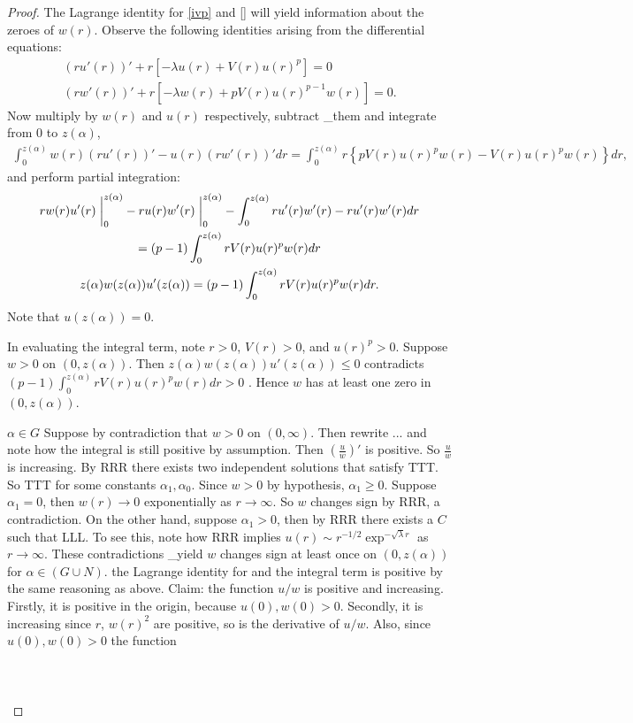 \begin{lemma}
\begin{proof}
  \seperate

The Lagrange identity for \ref{ivp} and \ref{} will yield information about the zeroes of $w(r)$.
Observe the following identities arising from the differential equations:
\begin{gather*}
  (ru'(r))'+r\left[-\lambda u(r)+V(r)u(r)^p\right]=0\\
  (rw'(r))'+r\left[-\lambda w(r)+pV(r)u(r)^{p-1}w(r)\right]=0.
\end{gather*}
Now multiply by $w(r)$ and $u(r)$ respectively, subtract \_them and integrate from 0 to $z(\alpha)$,
\begin{gather*}
  \int_0^{z(\alpha)}w(r)(ru'(r))'-u(r)(rw'(r))'dr=%
  \int_0^{z(\alpha)}r\left\{pV(r)u(r)^pw(r)-V(r)u(r)^pw(r)\right\}dr,
\end{gather*}
and perform partial integration:
\begin{gather*}
  rw(r)u'(r)\at_0^{z(\alpha)}-ru(r)w'(r)\at_0^{z(\alpha)}-
  \int_0^{z(\alpha)}ru'(r)w'(r)-ru'(r)w'(r)dr\\
  =(p-1)\int_0^{z(\alpha)}rV(r)u(r)^pw(r)dr\\
  z(\alpha)w(z(\alpha))u'(z(\alpha))=(p-1)\int_0^{z(\alpha)}rV(r)u(r)^pw(r)dr.
\end{gather*}
Note that $u(z(\alpha))=0$.

\seperate

In evaluating the integral term, {\color{gray}note $r>0$, $V(r)>0$, and $u(r)^p>0$.
Suppose $w>0$ on $(0,z(\alpha))$.
Then $z(\alpha)w(z(\alpha))u'(z(\alpha))\leq0$ contradicts
$(p-1)\int_0^{z(\alpha)}rV(r)u(r)^pw(r)dr>0$ \Lightning.
Hence $w$ has at least one zero in $(0,z(\alpha))$.}

\seperate

\underline{$\alpha\in G$}
Suppose by contradiction that $w>0$ on $(0,\infty)$. {\color{gray}
Then rewrite ... and note how the integral is still positive by assumption.
Then $\left(\frac{u}{w}\right)'$ is positive.
So $\frac{u}{w}$ is increasing.
By RRR there exists two independent solutions that satisfy TTT.
So TTT for some constants $\alpha_1,\alpha_0$.
Since $w>0$ by hypothesis, $\alpha_1\geq0$.
Suppose $\alpha_1=0$, then $w(r)\to0$ exponentially as $r\to\infty$.
So $w$ changes sign by RRR, a contradiction.
On the other hand, suppose $\alpha_1>0$, then by RRR there exists a $C$ such that LLL.
To see this, note how RRR implies $u(r)\sim r^{-1/2}\exp^{-\sqrt{\lambda}r}$ as $r\to\infty$.
These contradictions \_yield $w$ changes sign at least once on $(0,z(\alpha))$ for $\alpha\in(G\cup N)$.}
the Lagrange identity for and the integral term is positive by the same reasoning as above.
Claim: the function $u/w$ is positive and increasing.
Firstly, it is positive in the origin, because $u(0),w(0)>0$.
Secondly, it is increasing since $r$, $w(r)^2$ are positive, so is the derivative of $u/w$.
Also, since $u(0),w(0)>0$ the function \\ \\
\underline{}\\ \\
\underline{}
\end{proof}
\end{lemma}
